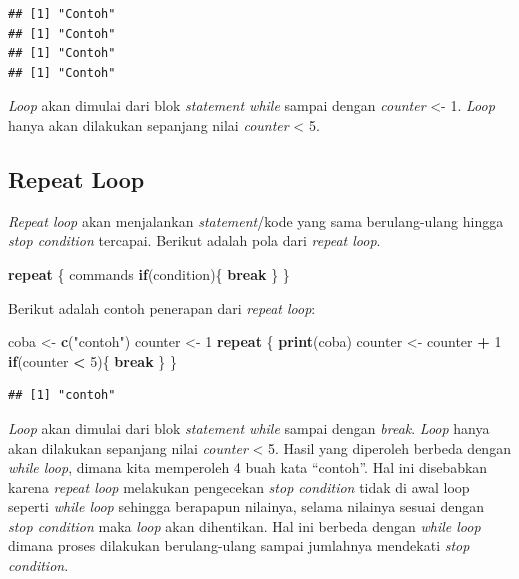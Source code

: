 \documentclass[]{book}
\newenvironment{Shaded}{\begin{snugshade}}{\end{snugshade}}
\newcommand{\ControlFlowTok}[1]{\textcolor[rgb]{0.13,0.29,0.53}{\textbf{#1}}}
\newcommand{\DecValTok}[1]{\textcolor[rgb]{0.00,0.00,0.81}{#1}}
\newcommand{\KeywordTok}[1]{\textcolor[rgb]{0.13,0.29,0.53}{\textbf{#1}}}
\newcommand{\NormalTok}[1]{#1}
\newcommand{\OperatorTok}[1]{\textcolor[rgb]{0.81,0.36,0.00}{\textbf{#1}}}
\newcommand{\StringTok}[1]{\textcolor[rgb]{0.31,0.60,0.02}{#1}}
\theoremstyle{definition}
\theoremstyle{definition}
\theoremstyle{definition}
\theoremstyle{remark}
\begin{document}
\begin{verbatim}
## [1] "Contoh"
## [1] "Contoh"
## [1] "Contoh"
## [1] "Contoh"
\end{verbatim}

\emph{Loop} akan dimulai dari blok \emph{statement while} sampai dengan \emph{counter} \textless{}- 1. \emph{Loop} hanya akan dilakukan sepanjang nilai \emph{counter} \textless{} 5.

\hypertarget{repeatloop}{%
\subsection{Repeat Loop}\label{repeatloop}}

\emph{Repeat loop} akan menjalankan \emph{statement}/kode yang sama berulang-ulang hingga \emph{stop condition} tercapai. Berikut adalah pola dari \emph{repeat loop}.

\begin{Shaded}
\begin{Highlighting}[]
\ControlFlowTok{repeat}\NormalTok{ \{}
\NormalTok{  commands}
  \ControlFlowTok{if}\NormalTok{(condition)\{}
    \ControlFlowTok{break}
\NormalTok{  \}}
\NormalTok{\}}
\end{Highlighting}
\end{Shaded}

Berikut adalah contoh penerapan dari \emph{repeat loop}:

\begin{Shaded}
\begin{Highlighting}[]
\NormalTok{coba <-}\StringTok{ }\KeywordTok{c}\NormalTok{(}\StringTok{"contoh"}\NormalTok{)}
\NormalTok{counter <-}\StringTok{ }\DecValTok{1}
\ControlFlowTok{repeat}\NormalTok{ \{}
  \KeywordTok{print}\NormalTok{(coba)}
\NormalTok{  counter <-}\StringTok{ }\NormalTok{counter }\OperatorTok{+}\StringTok{ }\DecValTok{1}
  \ControlFlowTok{if}\NormalTok{(counter }\OperatorTok{<}\StringTok{ }\DecValTok{5}\NormalTok{)\{}
\ControlFlowTok{break}
\NormalTok{  \}}
\NormalTok{\}}
\end{Highlighting}
\end{Shaded}

\begin{verbatim}
## [1] "contoh"
\end{verbatim}

\emph{Loop} akan dimulai dari blok \emph{statement while} sampai dengan \emph{break}. \emph{Loop} hanya akan dilakukan sepanjang nilai \emph{counter} \textless{} 5. Hasil yang diperoleh berbeda dengan \emph{while loop}, dimana kita memperoleh 4 buah kata ``contoh''. Hal ini disebabkan karena \emph{repeat loop} melakukan pengecekan \emph{stop condition} tidak di awal loop seperti \emph{while loop} sehingga berapapun nilainya, selama nilainya sesuai dengan \emph{stop condition} maka \emph{loop} akan dihentikan. Hal ini berbeda dengan \emph{while loop} dimana proses dilakukan berulang-ulang sampai jumlahnya mendekati \emph{stop condition}.
\end{document}
